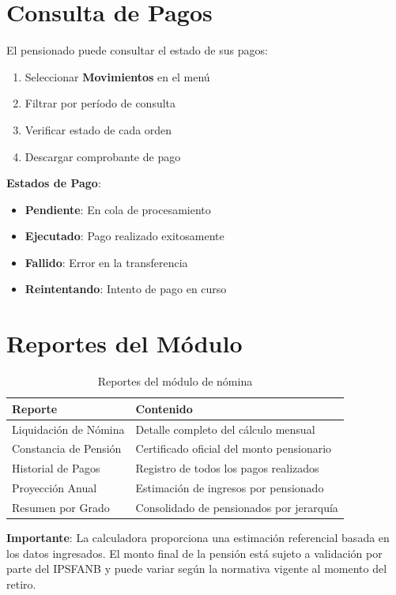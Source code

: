 \section{Consulta de Pagos}

El pensionado puede consultar el estado de sus pagos:

\begin{enumerate}[leftmargin=*]
    \item Seleccionar \textbf{Movimientos} en el menú
    \item Filtrar por período de consulta
    \item Verificar estado de cada orden
    \item Descargar comprobante de pago
\end{enumerate}

\begin{tcolorbox}[
    enhanced,
    colback=sandraSoft,
    colframe=sandraDark,
    width=0.9\textwidth,
    halign=center
]
\small
\textbf{Estados de Pago}:
\begin{itemize}
    \item \textbf{Pendiente}: En cola de procesamiento
    \item \textbf{Ejecutado}: Pago realizado exitosamente
    \item \textbf{Fallido}: Error en la transferencia
    \item \textbf{Reintentando}: Intento de pago en curso
\end{itemize}
\end{tcolorbox}

\section{Reportes del Módulo}

\begin{longtable}{p{4cm}p{8cm}}
\toprule
\textbf{Reporte} & \textbf{Contenido} \\
\midrule
\endhead
\bottomrule
\caption{Reportes del módulo de nómina}
\label{tab:reportes-nomina}
\endlastfoot

Liquidación de Nómina & Detalle completo del cálculo mensual \\
Constancia de Pensión & Certificado oficial del monto pensionario \\
Historial de Pagos & Registro de todos los pagos realizados \\
Proyección Anual & Estimación de ingresos por pensionado \\
Resumen por Grado & Consolidado de pensionados por jerarquía \\
\end{longtable}

\begin{tcolorbox}[
    enhanced,
    colback=sandraSoft,
    colframe=sandraGreen,
    width=0.9\textwidth,
    halign=center
]
\small
\textbf{Importante}: La calculadora proporciona una estimación referencial basada en los datos ingresados. El monto final de la pensión está sujeto a validación por parte del IPSFANB y puede variar según la normativa vigente al momento del retiro.
\end{tcolorbox}

\newpage
